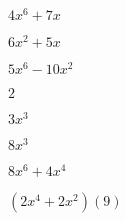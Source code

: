\documentclass{article}
\begin{document}
\begin{multicols}{2}
\item $4x^{6}+7x$\item $6x^2+5x$\item $5x^{6}-10x^2$\item $2$\item $3x^{3}$\item $8x^{3}$\item $8x^{6}+4x^{4}$\item $(2x^{4}+2x^2)(9)$\
\end{multicols}
\end{document}
